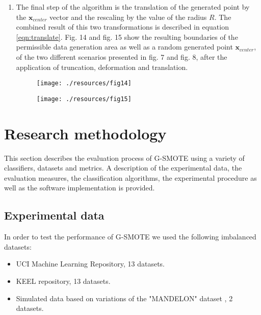 \documentclass[parskip=full]{scrartcl}
\begin{document}
\begin{enumerate}
	\item The final step of the algorithm is the translation of the generated
	point by the \( \textbf{x}_{center} \) vector and the rescaling by the value
	of the radius \( R \). The combined result of this two transformations is
	described in equation \eqref{eqn:translate}. Fig. 14 and fig. 15 show the
	resulting boundaries of the permissible data generation area as well as a
	random generated point \( \textbf{x}_{center} \), of the two different
	scenarios presented in fig. 7 and fig. 8, after the application of
	truncation, deformation and translation.

	\begin{figure}[H]
		\centering
		\texttt{[image: ./resources/fig14]}
	\end{figure}
	
	\begin{figure}[H]
		\centering
		\texttt{[image: ./resources/fig15]}
	\end{figure}

\end{enumerate}

\section{Research methodology}

This section describes the evaluation process of G-SMOTE using a variety of
classifiers, datasets and metrics. A description of the experimental data, the
evaluation measures, the classification algorithms, the experimental procedure
as well as the software implementation is provided.

\subsection{Experimental data}

In order to test the performance of G-SMOTE we used the following imbalanced
datasets:

\begin{itemize}
	
	\renewcommand\labelitemi{--}

	\item UCI Machine Learning Repository, 13 datasets.

	\item KEEL repository, 13 datasets.

	\item Simulated data based on variations of the "MANDELON" dataset
	\cite{Guyon2003}, 2 datasets.

\end{itemize}
\end{document}
